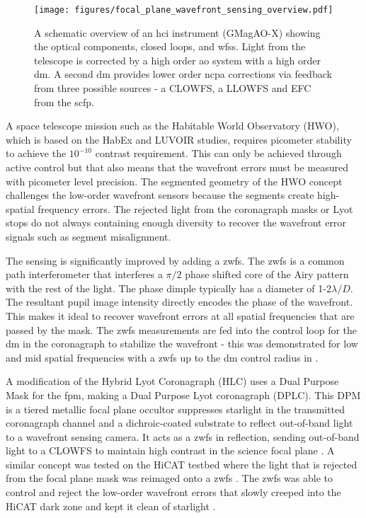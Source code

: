 \documentclass[letterpaper]{ar-1col}
\newcommand{\ld}{$\lambda/D$}
\begin{document}
\begin{figure}[ht]
  \centering
  \texttt{[image: figures/focal\_plane\_wavefront\_sensing\_overview.pdf]}
  \caption{A schematic overview of an \ac{hci} instrument (GMagAO-X) showing the optical components, closed loops, and \acp{wfs}.
  Light from the telescope is corrected by a high order \ac{ao} system with a high order \ac{dm}.
  A second \ac{dm} provides lower order \ac{ncpa} corrections via feedback from three possible sources - a CLOWFS, a LLOWFS and EFC from the \ac{scfp}.}
  \label{fig:aoinstloops}
\end{figure}

A space telescope mission such as the Habitable World Observatory (HWO), which is based on the HabEx and LUVOIR studies, requires picometer stability to achieve the $10^{-10}$ contrast requirement.
%
This can only be achieved through active control but that also means that the wavefront errors must be measured with picometer level precision.
%
The segmented geometry of the HWO concept challenges the low-order wavefront sensors because the segments create high-spatial frequency errors.
%
The rejected light from the coronagraph masks or Lyot stops do not always containing enough diversity to recover the wavefront error signals such as segment misalignment.

The sensing is significantly improved by adding a \ac{zwfs}. The \ac{zwfs} is a common path interferometer that interferes a $\pi/2$ phase shifted core of the Airy pattern with the rest of the light.
%
The phase dimple typically has a diameter of 1-2\ld{}.
%
The resultant pupil image intensity directly encodes the phase of the wavefront.
%
This makes it ideal to recover wavefront errors at all spatial frequencies that are passed by the mask.
%
The \ac{zwfs} measurements are fed into the control loop for the \ac{dm} in the coronagraph to stabilize the wavefront - this was demonstrated for low and mid spatial frequencies with a \ac{zwfs} up to the \ac{dm} control radius in \citet{Ruane20}.

A modification of the Hybrid Lyot Coronagraph (HLC) uses a Dual Purpose Mask for the \ac{fpm}, making a Dual Purpose Lyot coronagraph (DPLC).
%
This DPM is a tiered metallic focal plane occultor suppresses starlight in the transmitted coronagraph channel and a dichroic-coated substrate to reflect out-of-band light to a wavefront sensing camera.
%
It acts as a \ac{zwfs} in reflection, sending out-of-band light to a CLOWFS to maintain high contrast in the science focal plane \citep{Ruane23}.
%
A similar concept was tested on the HiCAT testbed where the light that is rejected from the focal plane mask was reimaged onto a \ac{zwfs} \citep{Pourcelot22,Pourcelot23}.
%
The \ac{zwfs} was able to control and reject the low-order wavefront errors that slowly creeped into the HiCAT dark zone and kept it clean of starlight \citep{Soummer22}.
\end{document}
